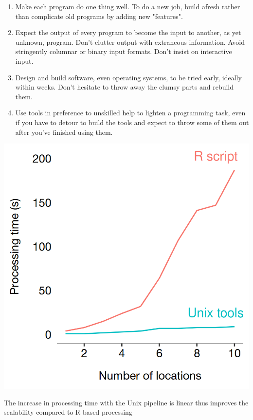 \begin{enumerate}[rightmargin=1cm]
  \setlength{\itemindent}{2em}
  \itemsep-0.25em
	\item Make each program do one thing well. To do a new job, build afresh rather than complicate old programs by adding new "features".
	\item Expect the output of every program to become the input to another, as yet unknown, program. Don't clutter output with extraneous information. Avoid stringently columnar or binary input formats. Don't insist on interactive input.
	\item Design and build software, even operating systems, to be tried early, ideally within weeks. Don't hesitate to throw away the clumsy parts and rebuild them.
	\item Use tools in preference to unskilled help to lighten a programming task, even if you have to detour to build the tools and expect to throw some of them out after you've finished using them.
\end{enumerate}

\begin{marginfigure}
  \forcerectofloat
  \includegraphics[trim={0 0 0 0},clip]{images/processing-times-r.png}
  \caption{The increase in processing time with the Unix pipeline is linear thus improves the scalability compared to R based processing}
  \label{figure:toolkit:time:new}
\end{marginfigure}

